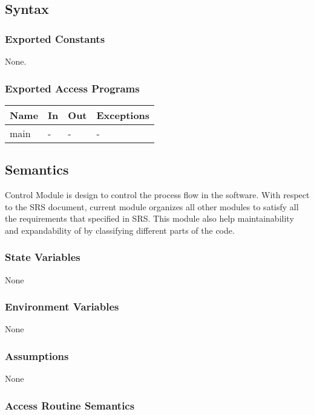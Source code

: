 \documentclass[12pt, titlepage]{article}
\begin{document}
\subsection{Syntax}

\subsubsection{Exported Constants}
None.
\subsubsection{Exported Access Programs}

\begin{center}
\begin{tabular}{p{2cm} p{4cm} p{4cm} p{2cm}}
\hline
\textbf{Name} & \textbf{In} & \textbf{Out} & \textbf{Exceptions} \\
\hline
main & - & - & - \\
\hline
\end{tabular}
\end{center}

\subsection{Semantics}
\progname{} Control Module is design to control the process flow in the
software. With respect to the SRS document, current module organizes all other
modules to satisfy all the requirements that specified in SRS. This module also
help maintainability and expandability of \progname{} by classifying different
parts of the code.

\subsubsection{State Variables}

None

\subsubsection{Environment Variables}

None

\subsubsection{Assumptions}

None
 
\subsubsection{Access Routine Semantics}
\end{document}
